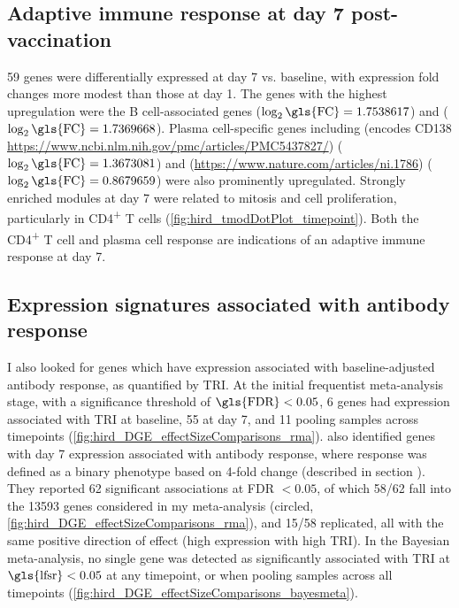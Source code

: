 \subsection{Adaptive immune response at day 7 post-vaccination}

59 genes were differentially expressed at day 7 vs. baseline, with expression fold changes more modest than those at day 1.
The genes with the highest upregulation were the B cell-associated genes  ($\log_2\text{\gls{FC}} = 1.7538617$) and  ($\log_2\text{\gls{FC}} = 1.7369668$).
Plasma cell-specific genes including  (encodes CD138 \url{https://www.ncbi.nlm.nih.gov/pmc/articles/PMC5437827/}) ($\log_2\text{\gls{FC}} = 1.3673081$) and  (\url{https://www.nature.com/articles/ni.1786}) ($\log_2\text{\gls{FC}} = 0.8679659$) were also prominently upregulated.
Strongly enriched modules at day 7 were related to mitosis and cell proliferation, particularly in CD4\textsuperscript{+} T cells (\autoref{fig:hird_tmodDotPlot_timepoint}).
Both the CD4\textsuperscript{+} T cell and plasma cell response are indications of an adaptive immune response at day 7.

\subsection{Expression signatures associated with antibody response}

I also looked for genes which have expression associated with baseline-adjusted antibody response, as quantified by \gls{TRI}.
At the initial frequentist meta-analysis stage, with a significance threshold of $\text{\gls{FDR}} < 0.05$, 6 genes had expression associated with \gls{TRI} at baseline, 55 at day 7, and 11 pooling samples across timepoints (\autoref{fig:hird_DGE_effectSizeComparisons_rma}).
\autocite{sobolev2016AdjuvantedInfluenzaH1N1Vaccination} also identified genes with day 7 expression associated with antibody response, where response was defined as a binary phenotype based on 4-fold change (described in section ).
They reported 62 significant associations at \gls{FDR} $< 0.05$, of which 58/62 fall into the 13593 genes considered in my meta-analysis (circled, \autoref{fig:hird_DGE_effectSizeComparisons_rma}), and 15/58 replicated, all with the same positive direction of effect (high expression with high \gls{TRI}).
In the Bayesian meta-analysis, no single gene was detected as significantly associated with \gls{TRI} at $\text{\gls{lfsr}} < 0.05$ at any timepoint, or when pooling samples across all timepoints (\autoref{fig:hird_DGE_effectSizeComparisons_bayesmeta}).

